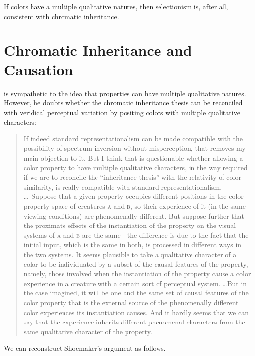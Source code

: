 \documentclass[12pt]{article}
\begin{document}
If colors have a multiple qualitative natures, then selectionism is, after all, consistent with chromatic inheritance.


\section{Chromatic Inheritance and Causation}\label{sec:inhertance_and_chromatic_causation}

\citet{Shoemaker:2006vn} is sympathetic to the idea that properties can have multiple qualitative natures. However, he doubts whether the chromatic inheritance thesis can be reconciled with veridical perceptual variation by positing colors with multiple qualitative characters: 
\begin{quote}
	If indeed standard representationalism can be made compatible with the possibility of spectrum inversion without misperception, that removes my main objection to it. But I think that is questionable whether allowing a color property to have multiple qualitative characters, in the way required if we are to reconcile the ``inheritance thesis'' with the relativity of color similarity, is really compatible with standard representationalism. \ldots\ Suppose that a given property occupies different positions in the color property space of creatures \textsc{a} and \textsc{b}, so their experience of it (in the same viewing conditions) are phenomenally different. But suppose further that the proximate effects of the instantiation of the property on the visual systems of \textsc{a} and \textsc{b} are the same---the difference is due to the fact that the initial input, which is the same in both, is processed in different ways in the two systems. It seems plausible to take a qualitative character of a color to be individuated by a subset of the causal features of the property, namely, those involved when the instantiation of the property cause a color experience in a creature with a certain sort of perceptual system. \ldots But in the case imagined, it will be one and the same set of causal features of the color property that is the external source of the phenomenally different color experiences its instantiation causes. And it hardly seems that we can say that the experience inherits different phenomenal characters from the same qualitative character of the property. \citep[p.\ 269]{Shoemaker:wk} 
\end{quote}

We can reconstruct Shoemaker's argument as follows.
\end{document}
